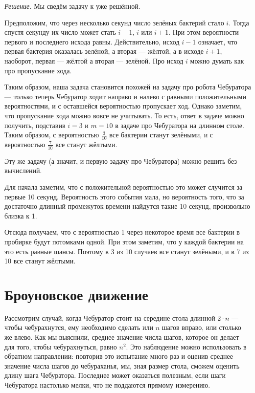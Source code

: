 \documentclass{article}
\begin{document}
\medskip
\noindent\textit{Решение.}
Мы сведём задачу к уже решённой.

Предположим, что через несколько секунд 
число зелёных бактерий стало $i$.
Тогда спустя секунду их число может стать $i-1$, $i$ или $i+1$.
При этом вероятности первого и последнего исхода равны.
Действительно, исход $i-1$ означает, 
что первая бактерия оказалась зелёной, а вторая --- жёлтой,
а в исходе $i+1$,
наоборот, первая --- жёлтой а вторая --- зелёной.
Про исход $i$ можно думать как про пропускание хода.

Таким образом, наша задача становится похожей на задачу про робота Чебуратора --- только теперь Чебуратор ходит направо и налево с равными положительными вероятностями, и с оставшейся вероятностью пропускает ход.
Однако заметим, что пропускание хода можно вовсе не учитывать.
То есть, ответ в задаче можно получить, подставив $i=3$ и $m=10$ в задаче про Чебуратора на длинном столе.
Таким образом, с вероятностью $\tfrac{3}{10}$ все бактерии станут зелёными, 
и с вероятностью $\tfrac{7}{10}$ все станут жёлтыми.

\medskip

Эту же задачу (а значит, и первую задачу про Чебуратора)
можно решить без вычислений.

Для начала заметим, что с положительной вероятностью это может случится за первые 10 секунд. 
Вероятность этого события мала,
но вероятность того, что за достаточно длинный промежуток времени найдутся такие 10 секунд, произвольно близка к 1.

Отсюда получаем, что с вероятностью 1
через некоторое время все бактерии в пробирке будут потомками одной.
При этом заметим, что у каждой бактерии на это есть равные шансы.
Поэтому в 3 из 10 случаев все станут зелёными, и в 7 из 10 все станут жёлтыми.


\section{Броуновское движение}

Рассмотрим случай, когда Чебуратор стоит на середине стола длинной $2\cdot n$ ---
чтобы чебурахнутся, ему необходимо сделать или $n$ шагов вправо, или столько же влево.
Как мы выяснили, среднее значение числа шагов, которое он делает для того, чтобы чебурахнуться, равно $n^2$. 
Это наблюдение можно использовать в обратном направлении:
повторив это испытание много раз и оценив среднее значение числа шагов до чебураханья, мы, 
зная размер стола, сможем оценить длину шага Чебуратора.
Последнее может оказаться полезным, если шаги Чебуратора настолько мелки, что не поддаются прямому измерению. 
\end{document}
